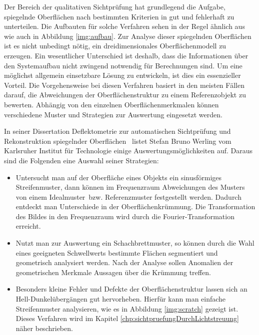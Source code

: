 Der Bereich der qualitativen Sichtprüfung hat grundlegend die Aufgabe, spiegelnde Oberflächen nach bestimmten Kriterien in gut und fehlerhaft zu unterteilen.
Die Aufbauten für solche Verfahren sehen in der Regel ähnlich aus wie auch in Abbildung \ref{img:aufbau}.
Zur Analyse dieser spiegelnden Oberflächen ist es nicht unbedingt nötig, ein dreidimensionales Oberflächenmodell zu erzeugen.
Ein wesentlicher Unterschied ist deshalb, dass die Informationen über den Systemaufbau nicht zwingend notwendig für Berechnungen sind.
Um eine möglichst allgemein einsetzbare Lösung zu entwickeln, ist dies ein essenzieller Vorteil.
Die Vorgehensweise bei diesen Verfahren basiert in den meisten Fällen darauf, die Abweichungen der Oberflächenstruktur zu einem Referenzobjekt zu bewerten.
Abhängig von den einzelnen Oberflächenmerkmalen können verschiedene Muster und Strategien zur Auswertung eingesetzt werden.

\p
In seiner Dissertation \glqq Deflektometrie zur automatischen Sichtprüfung und Rekonstruktion spiegelnder Oberflächen\grqq ~\cite{kit_werling} listet Stefan Bruno Werling vom Karlsruher Institut für Technologie einige Auswertungsmöglichkeiten auf.
Daraus sind die Folgenden eine Auswahl seiner Strategien:

\begin{itemize}
	\item Untersucht man auf der Oberfläche eines Objekts ein sinusförmiges Streifenmuster, dann können im Frequenzraum Abweichungen des Musters von einem \glqq Idealmuster\grqq ~bzw. Referenzmuster festgestellt werden.
	Dadurch entdeckt man Unterschiede in der Oberflächenkrüm\-mung.
	Die Transformation des Bildes in den Frequenzraum wird durch die Fourier-Transformation erreicht.
	
	\item Nutzt man zur Auswertung ein Schachbrettmuster, so können durch die Wahl eines geeigneten Schwellwerts bestimmte Flächen segmentiert und geometrisch analysiert werden.
	Nach der Analyse sollen Anomalien der geometrischen Merkmale Aussagen über die Krümmung treffen.
	
	\item Besonders kleine Fehler und Defekte der Oberflächenstruktur lassen sich an Hell-Dunkelübergängen gut hervorheben.
	Hierfür kann man einfache Streifenmuster analysieren, wie es in Abbildung \ref{img:scratch} gezeigt ist.
	Dieses Verfahren wird im Kapitel \ref{chp:sichtpruefungDurchLichtstreuung} näher beschrieben.
\end{itemize}

